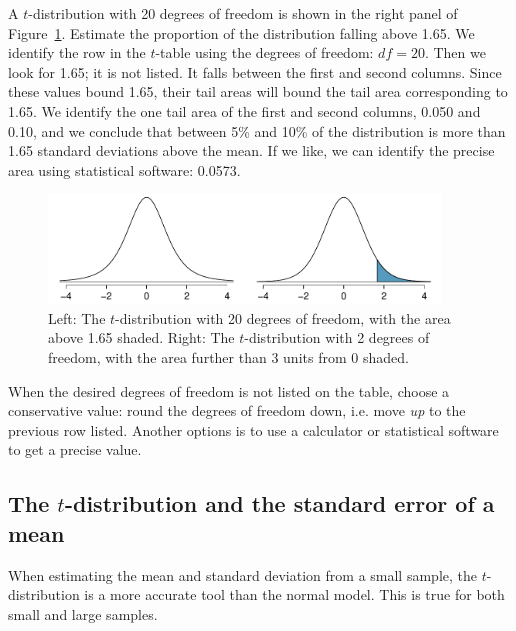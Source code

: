 \begin{example}{A $t$-distribution with 20 degrees of freedom is shown in the right panel of Figure~\ref{tDistDF3_and_20}. Estimate the proportion of the distribution falling above 1.65.}
We identify the row in the $t$-table using the degrees of freedom: $df=20$. Then we look for 1.65; it is not listed. It falls between the first and second columns. Since these values bound 1.65, their tail areas will bound the tail area corresponding to 1.65. We identify the one tail area of the first and second columns, 0.050 and 0.10, and we conclude that between 5\% and 10\% of the distribution is more than 1.65 standard deviations above the mean. If we like, we can identify the precise area using statistical software: 0.0573.
\end{example}

\begin{figure}
\centering
\includegraphics[width=0.93\textwidth]{ch_inference_for_means/figures/tDistDF3_and_20/tDistDF3_and_20}
\caption{Left: The $t$-distribution with 20 degrees of freedom, with the area above 1.65 shaded. Right: The $t$-distribution with 2 degrees of freedom, with the area further than 3 units from 0 shaded.}
\label{tDistDF3_and_20}
\end{figure}

\textA{\pagebreak}

When the desired degrees of freedom is not listed on the table, choose a conservative value: round the degrees of freedom down, i.e. move \emph{up} to the previous row listed. Another options is to use a calculator or statistical software to get a precise value.

\subsection{The $t$-distribution and the standard error of a mean}
\label{tDistSolutionToSEProblem}

When estimating the mean and standard deviation from a small sample, the $t$-distribution is a more accurate tool than the normal model. This is true for both small and large samples.

